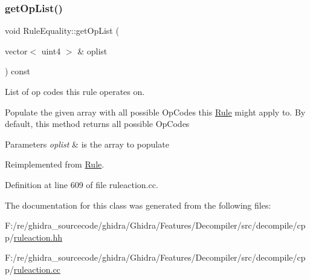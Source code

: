 \subsubsection{\texorpdfstring{getOpList()}{getOpList()}}
{\footnotesize\ttfamily void Rule\+Equality\+::get\+Op\+List (\begin{DoxyParamCaption}\item[{vector$<$ uint4 $>$ \&}]{oplist }\end{DoxyParamCaption}) const\hspace{0.3cm}{\ttfamily [virtual]}}



List of op codes this rule operates on. 

Populate the given array with all possible Op\+Codes this \mbox{\hyperlink{class_rule}{Rule}} might apply to. By default, this method returns all possible Op\+Codes 
\begin{DoxyParams}{Parameters}
{\em oplist} & is the array to populate \\
\hline
\end{DoxyParams}


Reimplemented from \mbox{\hyperlink{class_rule_a4023bfc7825de0ab866790551856d10e}{Rule}}.



Definition at line 609 of file ruleaction.\+cc.



The documentation for this class was generated from the following files\+:\begin{DoxyCompactItemize}
\item 
F\+:/re/ghidra\+\_\+sourcecode/ghidra/\+Ghidra/\+Features/\+Decompiler/src/decompile/cpp/\mbox{\hyperlink{ruleaction_8hh}{ruleaction.\+hh}}\item 
F\+:/re/ghidra\+\_\+sourcecode/ghidra/\+Ghidra/\+Features/\+Decompiler/src/decompile/cpp/\mbox{\hyperlink{ruleaction_8cc}{ruleaction.\+cc}}\end{DoxyCompactItemize}
